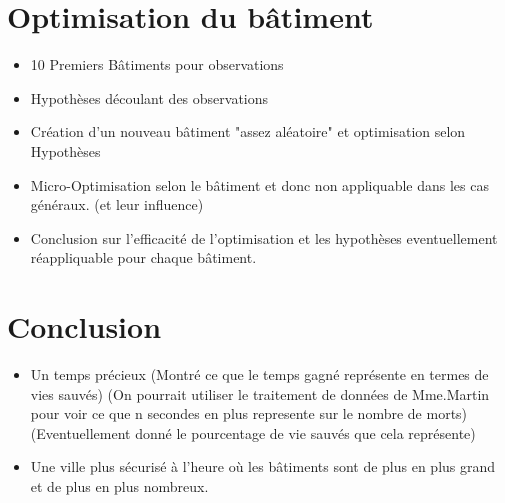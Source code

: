 \documentclass[12pt]{article}
\begin{document}
\section{Optimisation du bâtiment}

\begin{itemize}
    \item 10 Premiers Bâtiments pour observations
    \item Hypothèses découlant des observations
    \item Création d'un nouveau bâtiment "assez aléatoire" et optimisation selon Hypothèses
    \item Micro-Optimisation selon le bâtiment et donc non appliquable dans les cas généraux. (et leur influence)
    \item Conclusion sur l'efficacité de l'optimisation et les hypothèses eventuellement réappliquable pour chaque bâtiment.
\end{itemize}

\section{Conclusion}

\begin{itemize}
    \item Un temps précieux
    \newline(Montré ce que le temps gagné représente en termes de vies sauvés)
    \newline(On pourrait utiliser le traitement de données de Mme.Martin pour voir ce que n secondes en plus represente sur le nombre de morts)
    \newline(Eventuellement donné le pourcentage de vie sauvés que cela représente)
    \item Une ville plus sécurisé à l'heure où les bâtiments sont de plus en plus grand et de plus en plus nombreux.
\end{itemize}
\end{document}
